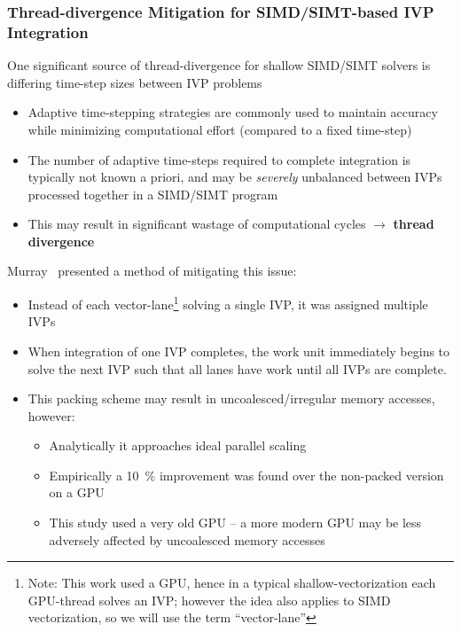 \documentclass{beamer}
\begin{document}
\begin{frame}
 \frametitle{Thread-divergence Mitigation for SIMD\slash SIMT-based IVP Integration}
 {
 One significant source of thread-divergence for shallow SIMD\slash SIMT solvers is differing time-step sizes between IVP problems
 \begin{itemize}
   \item Adaptive time-stepping strategies are commonly used to maintain accuracy while minimizing computational effort (compared to a fixed time-step)
   \item The number of adaptive time-steps required to complete integration is typically not known a priori, and may be \textit{severely} unbalanced between IVPs processed together in a SIMD\slash SIMT program
    \item This may result in significant wastage of computational cycles $\rightarrow$ \textbf{thread divergence}
 \end{itemize}
 }
 {
  Murray~ presented a method of mitigating this issue:
  \begin{itemize}
    \item Instead of each vector-lane\footnote{Note: This work used a GPU, hence in a typical shallow-vectorization each GPU-thread solves an IVP; however the idea also applies to SIMD vectorization, so we will use the term ``vector-lane''} solving a single IVP, it was assigned multiple IVPs
    \item When integration of one IVP completes, the work unit immediately begins to solve the next IVP such that all lanes have work until all IVPs are complete.
    \item This packing scheme may result in uncoalesced\slash irregular memory accesses, however:
    \begin{itemize}
     \item Analytically it approaches ideal parallel scaling
     \item Empirically a \SI{10}{\percent} improvement  was found over the non-packed version on a GPU
     \item This study used a very old GPU -- a more modern GPU may be less adversely affected by uncoalesced memory accesses
    \end{itemize}
  \end{itemize}
 }
\end{frame}
\end{document}
